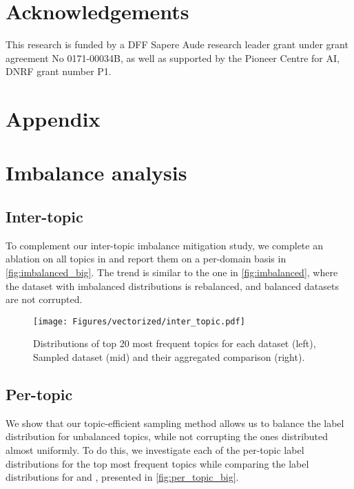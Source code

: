 \documentclass[11pt]{article}
\begin{document}
\label{sec:limitations}

\section*{Acknowledgements}

This research is funded by a DFF Sapere Aude research leader grant under grant agreement No 0171-00034B, as well as supported by the Pioneer Centre for AI, DNRF
grant number P1.




\clearpage
\appendix


\section*{Appendix}
\label{sec:Appendix}





\section{Imbalance analysis}
\label{Appendix:imbalances}

\subsection{Inter-topic}
\label{Appendix:inter_topic_analysis}

To complement our inter-topic imbalance mitigation study, we complete an ablation on all topics in  and report them on a per-domain basis in \autoref{fig:imbalanced_big}. The trend is similar to the one in \autoref{fig:imbalanced}, where the dataset with imbalanced distributions is rebalanced, and balanced datasets are not corrupted.

\begin{figure*}
\centering
\texttt{[image: Figures/vectorized/inter\_topic.pdf]}
\caption{Distributions of top 20 most frequent topics for each dataset (left), Sampled dataset  (mid) and their aggregated comparison (right).
}
\label{fig:imbalanced_big}
\end{figure*}


\subsection{Per-topic}
\label{Appendix:per_topic_analysis}

We show that our topic-efficient sampling method allows us to balance the label distribution for unbalanced topics, while not corrupting the ones distributed almost uniformly. To do this, we investigate each of the per-topic label distributions for the top  most frequent topics while comparing  the label distributions for  and , presented in \autoref{fig:per_topic_big}.
\end{document}
